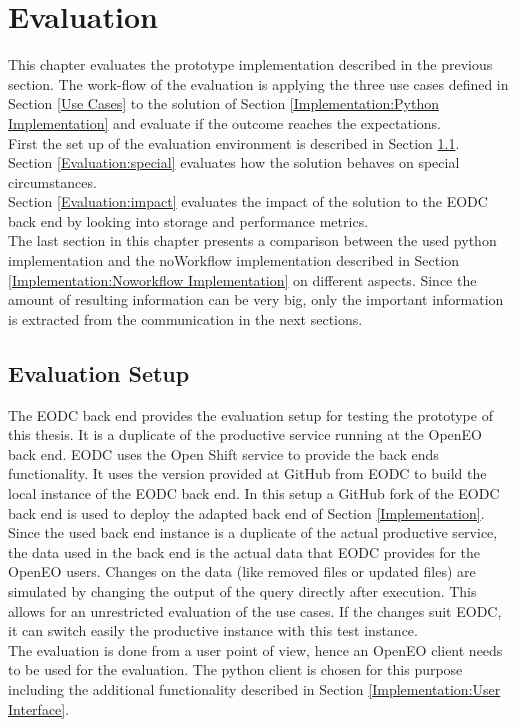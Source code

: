 \documentclass[draft,final]{vutinfth} %
\begin{document}
\chapter{Evaluation}\label{Evaluation}
This chapter evaluates the prototype implementation described in the previous section. The work-flow of the evaluation is applying the three use cases defined in Section \ref{Use Cases} to the solution of Section \ref{Implementation:Python Implementation} and evaluate if the outcome reaches the expectations.\\ First the set up of the evaluation environment is described in Section \ref{Evaluation:Setup}. \\ Section \ref{Evaluation:special} evaluates how the solution behaves on special circumstances. \\ Section \ref{Evaluation:impact} evaluates the impact of the solution to the EODC back end by looking into storage and performance metrics. \\ The last section in this chapter presents a comparison between the used python implementation and the noWorkflow implementation described in Section \ref{Implementation:Noworkflow Implementation} on different aspects. Since the amount of resulting information can be very big, only the important information is extracted from the communication in the next sections.


\section{Evaluation Setup}\label{Evaluation:Setup}
The EODC back end provides the evaluation setup for testing the prototype of this thesis. It is a duplicate of the productive service running at the OpenEO back end. EODC uses the Open Shift service to provide the back ends functionality. It uses the version provided at GitHub from EODC to build the local instance of the EODC back end. In this setup a GitHub fork of the EODC back end is used to deploy the adapted back end of Section \ref{Implementation}. Since the used back end instance is a duplicate of the actual productive service, the data used in the back end is the actual data that EODC provides for the OpenEO users. Changes on the data (like removed files or updated files) are simulated by changing the output of the query directly after execution. This allows for an unrestricted evaluation of the use cases. If the changes suit EODC, it can switch easily the productive instance with this test instance. \\
The evaluation is done from a user point of view, hence an OpenEO client needs to be used for the evaluation. The python client is chosen for this purpose including the additional functionality described in Section \ref{Implementation:User Interface}. \\ 
\end{document}
